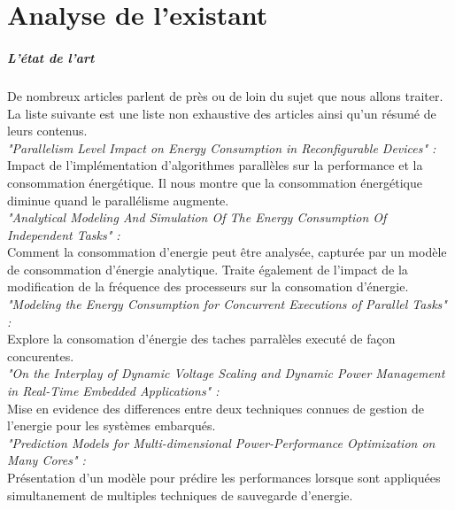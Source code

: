 \chapter{Analyse de l'existant}

\paragraph{L'état de l'art \\}
	De nombreux articles parlent de près ou de loin du sujet que nous allons traiter. \\
	La liste suivante est une liste non exhaustive des articles ainsi qu'un résumé de leurs contenus. \\

	\textit{"Parallelism Level Impact on Energy Consumption in Reconfigurable Devices" :}\\
		Impact de l’implémentation d'algorithmes parallèles sur la performance et la consommation énergétique. Il nous montre que la consommation énergétique diminue quand le parallélisme augmente.\\

	\textit{"Analytical Modeling And Simulation Of The Energy Consumption Of Independent Tasks" :}\\
		Comment la consommation d'energie peut être analysée, capturée par un modèle de consommation d'énergie analytique. Traite également de l'impact de la modification de la fréquence des processeurs sur la consomation d'énergie.\\

	\textit{"Modeling the Energy Consumption for Concurrent Executions of Parallel Tasks" :}\\
		Explore la consomation d'énergie des taches parralèles executé de façon concurentes. \\

	\textit {"On the Interplay of Dynamic Voltage Scaling and Dynamic Power Management in Real-Time Embedded Applications" :}\\
		Mise en evidence des differences entre deux techniques connues de gestion de l'energie pour les systèmes embarqués.\\

	\textit {"Prediction Models for Multi-dimensional Power-Performance Optimization on Many Cores" :}\\
		Présentation d'un modèle pour prédire les performances lorsque sont appliquées simultanement de multiples techniques de sauvegarde d'energie. \\


